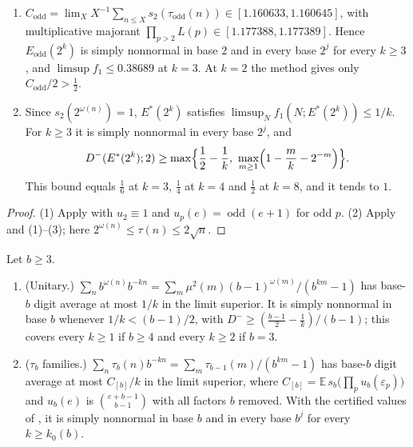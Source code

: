 \documentclass[11pt]{article}
\DeclareMathOperator{\odd}{odd}
\newcommand{\Ex}{\mathbb E}
\begin{document}
\begin{theorem}\label{thm:odd-unitary}
\begin{enumerate}[label=\textup{(\arabic*)},nosep]
\item $C_{\mathrm{odd}}=\lim_XX^{-1}\sum_{n\le X}s_2(\tau_{\mathrm{odd}}(n))\in[1.160633,1.160645]$, with multiplicative majorant $\prod_{p>2}L(p)\in[1.177388,1.177389]$. Hence $E_{\mathrm{odd}}(2^k)$ is simply nonnormal in base $2$ and in every base $2^j$ for every $k\ge3$, and $\limsup f_1\le0.38689$ at $k=3$. At $k=2$ the method gives only $C_{\mathrm{odd}}/2>\frac12$.
\item Since $s_2(2^{\omega(n)})=1$, $E^*(2^k)$ satisfies $\limsup_Nf_1(N;E^*(2^k))\le1/k$. For $k\ge3$ it is simply nonnormal in every base $2^j$, and
\[
D^-(E^*(2^k);2)\ge\max\Bigl\{\frac12-\frac1k,\ \max_{m\ge1}\Bigl(1-\frac mk-2^{-m}\Bigr)\Bigr\}.
\]
This bound equals $\frac16$ at $k=3$, $\frac14$ at $k=4$ and $\frac12$ at $k=8$, and it tends to $1$.
\end{enumerate}
\end{theorem}

\begin{proof}
(1) Apply  with $u_2\equiv1$ and $u_p(e)=\odd(e+1)$ for odd $p$. (2) Apply  and (1)--(3); here $2^{\omega(n)}\le\tau(n)\le2\sqrt n$.
\end{proof}

\begin{theorem}\label{thm:base-b}
Let $b\ge3$.
\begin{enumerate}[label=\textup{(\arabic*)},nosep]
\item \textup{(Unitary.)} $\sum_nb^{\omega(n)}b^{-kn}=\sum_m\mu^2(m)(b-1)^{\omega(m)}/(b^{km}-1)$ has base-$b$ digit average at most $1/k$ in the limit superior. It is simply nonnormal in base $b$ whenever $1/k<(b-1)/2$, with $D^-\ge(\frac{b-1}2-\frac1k)/(b-1)$; this covers every $k\ge1$ if $b\ge4$ and every $k\ge2$ if $b=3$.
\item \textup{($\tau_b$ families.)} $\sum_n\tau_b(n)b^{-kn}=\sum_m\tau_{b-1}(m)/(b^{km}-1)$ has base-$b$ digit average at most $C_{[b]}/k$ in the limit superior, where $C_{[b]}=\Ex\,s_b\bigl(\prod_pu_b(\varepsilon_p)\bigr)$ and $u_b(e)$ is $\binom{e+b-1}{b-1}$ with all factors $b$ removed. With the certified values of , it is simply nonnormal in base $b$ and in every base $b^j$ for every $k\ge k_0(b)$.
\end{enumerate}
\end{theorem}
\end{document}
